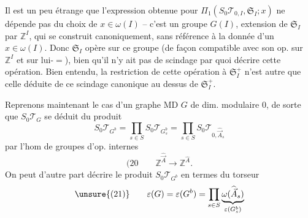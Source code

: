 Il est un peu étrange que l'expression obtenue pour $\Pi_1(S_0\mathcal T_{0,I},\mathfrak S_I;x)$ ne dépende pas du choix de $x\in\omega(I)$ -- c'est un groupe $G(I)$, extension de $\mathfrak S_I$ par $\mathbb Z^I$, qui se construit canoniquement, sans référence à la donnée d'un $x\in\omega(I)$. Donc $\mathfrak S_I$ opère sur ce groupe  (de façon compatible avec son op. sur $\mathbb Z^I$ et sur lui-$=$), bien qu'il n'y ait pas de scindage par quoi décrire cette opération. Bien entendu, la restriction de cette opération à $\mathfrak S_I^+$ n'est autre que celle déduite de ce scindage canonique au dessus de $\mathfrak S_I^+$.


Reprenons maintenant le cas d'un graphe MD $G$ de dim. modulaire $0$, de sorte que $S_0\mathcal T_G$ se déduit du produit
\[
S_0\mathcal T_{G^b}=\prod_{s\in S}S_0\mathcal T_{G_s^b}
=\prod_{s\in S}S_0\mathcal T_{0,\widehat{\vec A}_s}
\]
par l'hom de groupes  d'op. internes
\[
(20\qquad\mathbb Z^{\widehat{\vec A}}\longrightarrow\mathbb Z^{\widehat A}.
\]
On peut d'autre part décrire le produit $S_0\mathcal T_{G^b}$ en termes du torseur
\[
\unsure{(21)}\qquad\varepsilon(G)=\varepsilon(G^b)=\prod_{s\in S}\underbrace{\omega(\widehat{\vec A}_s)}_{\varepsilon(G_s^b)}
\]
